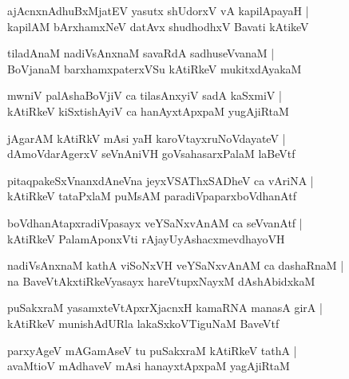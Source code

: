 \documentclass[twoside,12pt,openright]{book}
\newcounter{shloka}[chapter]
\begin{document}
\begin{shloka}%
ajAcnxnAdhuBxMjatEV yasutx shUdorxV vA kapilApayaH |\\
kapilAM bArxhamxNeV datAvx shudhodhxV Bavati kAtikeV 
\end{shloka}

\begin{shloka}%
tiladAnaM nadiVsAnxnaM savaRdA sadhuseVvanaM |\\
BoVjanaM barxhamxpaterxVSu kAtiRkeV mukitxdAyakaM 
\end{shloka}

\begin{shloka}%
mwniV palAshaBoVjiV ca tilasAnxyiV sadA kaSxmiV |\\
kAtiRkeV kiSxtishAyiV ca hanAyxtApxpaM yugAjiRtaM 
\end{shloka}

\begin{shloka}%
jAgarAM kAtiRkV mAsi yaH karoVtayxruNoVdayateV |\\
dAmoVdarAgerxV seVnAniVH goVsahasarxPalaM laBeVtf 
\end{shloka}

\begin{shloka}%
pitaqpakeSxVnanxdAneVna jeyxVSAThxSADheV ca vAriNA |\\
kAtiRkeV tataPxlaM puMsAM paradiVpaparxboVdhanAtf
\end{shloka}

\begin{shloka}%
boVdhanAtapxradiVpasayx veYSaNxvAnAM ca seVvanAtf |\\
kAtiRkeV PalamAponxVti rAjayUyAshacxmevdhayoVH 
\end{shloka}

\begin{shloka}%
nadiVsAnxnaM kathA viSoNxVH veYSaNxvAnAM ca dashaRnaM |\\
na BaveVtAkxtiRkeVyasayx hareVtupxNayxM dAshAbidxkaM 
\end{shloka}

\begin{shloka}%
puSakxraM yasamxteVtApxrXjacnxH kamaRNA manasA girA |\\
kAtiRkeV munishAdURla lakaSxkoVTiguNaM BaveVtf 
\end{shloka}

\begin{shloka}%
parxyAgeV mAGamAseV tu puSakxraM kAtiRkeV tathA |\\
avaMtioV mAdhaveV mAsi hanayxtApxpaM yagAjiRtaM 
\end{shloka}
\end{document}
